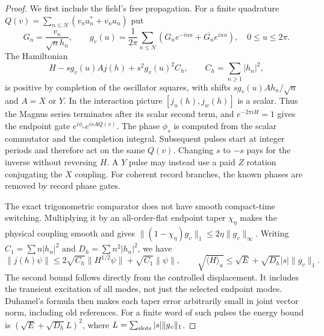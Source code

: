 \begin{proof}
We first include the field's free propagation. For a finite quadrature
$Q(v)=\sum_{n\leq N}(v_na_n^*+\overline{v_n}a_n)$ put
\[
 G_n=\frac{v_n}{\sqrt n h_n},\qquad
 g_v(u)=\frac1{2\pi}\sum_{n\leq N}
       (G_ne^{-inu}+\overline{G_n}e^{inu}),\quad 0\leq u\leq2\pi.
\]
The Hamiltonian
\[
 H-sg_v(u)A j(h)+s^2g_v(u)^2 C_h,
 \qquad C_h=\sum_{n\geq1}|h_n|^2,
\]
is positive by completion of the oscillator squares, with shifts
$sg_v(u)Ah_n/\sqrt n$ and $A=X$ or $Y$.
In the interaction picture $[j_u(h),j_w(h)]$ is a scalar.
Thus the Magnus series terminates after its scalar second term, and
$e^{-2\pi iH}=1$ gives the endpoint gate
$e^{i\phi_s}e^{isA Q(v)}$.
The phase $\phi_s$ is computed from the scalar commutator and the
completion integral. Subsequent pulses start at integer periods and
therefore act on the same $Q(v)$. Changing $s$ to $-s$ pays for the
inverse without reversing $H$. A $Y$ pulse may instead use a paid
$Z$ rotation conjugating the $X$ coupling.
For coherent record branches, the known phases are removed by
record phase gates.

The exact trigonometric comparator does not have smooth compact-time
switching. Multiplying it by an all-order-flat endpoint taper
$\chi_\eta$ makes the physical coupling smooth and gives
$\|(1-\chi_\eta)g_v\|_1\leq2\eta\|g_v\|_\infty$.
Writing $C_1=\sum n|h_n|^2$ and $D_h=\sum n^2|h_n|^2$, we have
\[
 \|j(h)\psi\|\leq2\sqrt{C_h}\|H^{1/2}\psi\|
                    +\sqrt{C_1}\|\psi\|,
 \qquad
 \sqrt{\langle H\rangle_u}\leq\sqrt E+
                  \sqrt{D_h}|s|\|g_v\|_1.
\]
The second bound follows directly from the controlled displacement.
It includes the transient excitation of all modes, not just the
selected endpoint modes. Duhamel's formula then makes each taper
error arbitrarily small in joint vector norm, including old references.
For a finite word of such pulses the energy bound is
$(\sqrt E+\sqrt{D_h}L)^2$, where
$L=\sum_{\rm slots}|s|\|g_v\|_1$.


\end{proof}
